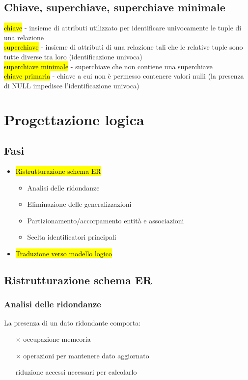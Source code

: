 \documentclass[a4paper]{article}
\begin{document}
\subsection{Chiave, superchiave, superchiave minimale}
\hl{chiave} - insieme di attributi utilizzato per identificare univocamente le tuple di una relazione\medskip\\
\hl{superchiave} - insieme di attributi di una relazione tali che le relative tuple sono tutte diverse tra loro (identificazione univoca)\medskip\\
\hl{superchiave minimale} - superchiave che non contiene una superchiave\medskip\\
\hl{chiave primaria} - chiave a cui non è permesso contenere valori nulli (la presenza di NULL impedisce l’identificazione univoca)

\section{Progettazione logica}
\subsection*{Fasi}
\begin{itemize}[noitemsep, leftmargin=*]
  \item \hl{Ristrutturazione schema ER}
        \begin{itemize}[noitemsep]
          \item Analisi delle ridondanze
          \item Eliminazione delle generalizzazioni
          \item Partizionamento/accorpamento entità e associazioni
          \item Scelta identificatori principali
        \end{itemize}
  \item \hl{Traduzione verso modello logico}
\end{itemize}

\subsection{Ristrutturazione schema ER}
\subsubsection{Analisi delle ridondanze}
La presenza di un dato ridondante comporta:
\begin{itemize}[noitemsep]
  \item[$\times$] occupazione memeoria
  \item[$\times$] operazioni per mantenere dato aggiornato
  \item[\checkmark] riduzione accessi necessari per calcolarlo
\end{itemize}
\end{document}
